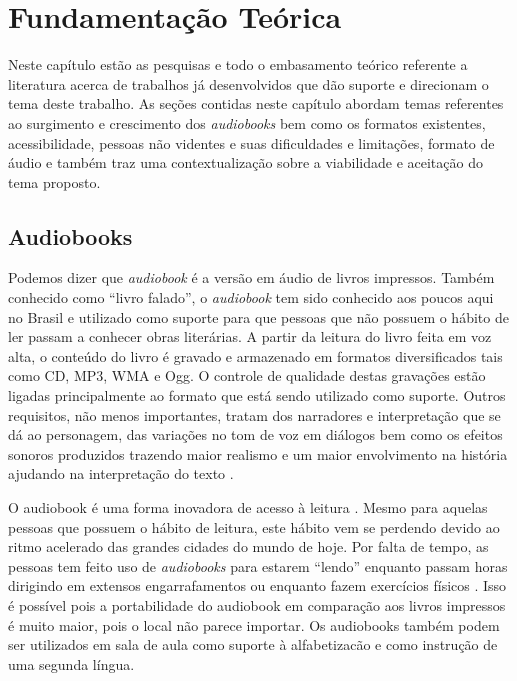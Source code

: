 \chapter[Fundamentação Teórica]{Fundamentação Teórica}\label{cap2}

Neste capítulo estão as pesquisas e todo o embasamento teórico referente a literatura acerca de trabalhos já desenvolvidos que dão suporte e direcionam o tema deste trabalho. As seções contidas neste capítulo abordam temas referentes ao surgimento e crescimento dos \textit{audiobooks} bem como os formatos existentes, acessibilidade, pessoas não videntes e suas dificuldades e limitações, formato de áudio e também traz uma contextualização sobre a viabilidade e aceitação do tema proposto.

\section{Audiobooks}

Podemos dizer que \textit{audiobook} é a versão em áudio de livros impressos. Também conhecido como ``livro falado'', o \textit{audiobook} tem sido conhecido aos poucos aqui no Brasil e utilizado como suporte para que pessoas que não possuem o hábito de ler passam a conhecer obras literárias. A partir da leitura do livro feita em voz alta, o conteúdo do livro é gravado e armazenado em formatos diversificados tais como CD, MP3, WMA e Ogg. O controle de qualidade destas gravações estão ligadas principalmente ao formato que está sendo utilizado como suporte. Outros requisitos, não menos importantes, tratam dos narradores e interpretação que se dá ao personagem, das variações no tom de voz em diálogos bem como os efeitos sonoros produzidos trazendo maior realismo e um maior envolvimento na história ajudando na interpretação  do texto \cite{torrenttitles}.

O audiobook é uma forma inovadora de acesso à leitura \cite{audiobooksuporte}. Mesmo para aquelas pessoas que possuem o hábito de leitura, este hábito vem se perdendo devido ao ritmo acelerado das grandes cidades do mundo de hoje. Por falta de tempo, as pessoas tem feito uso de \textit{audiobooks} para estarem ``lendo'' enquanto passam horas dirigindo em extensos engarrafamentos ou enquanto fazem exercícios físicos \cite{audiobookinovacao}. Isso é possível pois a portabilidade do audiobook em comparação aos livros impressos é muito maior, pois o local não parece importar. Os audiobooks também podem ser utilizados em sala de aula como suporte à alfabetizacão e como instrução de uma segunda língua.

